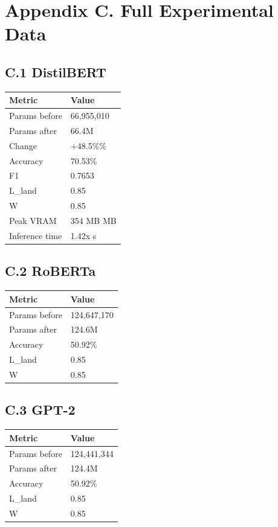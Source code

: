 \section{Appendix C. Full Experimental Data}

\subsection{C.1 DistilBERT}

\begin{table}[H]
\centering
\small
\begin{tabular}{ll}
\toprule
\textbf{Metric} & \textbf{Value} \\
\midrule
Params before & 66,955,010 \\
Params after & 66.4M \\
Change & +48.5\%\% \\
Accuracy & 70.53\% \\
F1 & 0.7653 \\
L\_land & 0.85 \\
W & 0.85 \\
Peak VRAM & 354 MB MB \\
Inference time & 1.42x s \\
\bottomrule
\end{tabular}
\end{table}

\subsection{C.2 RoBERTa}

\begin{table}[H]
\centering
\small
\begin{tabular}{ll}
\toprule
\textbf{Metric} & \textbf{Value} \\
\midrule
Params before & 124,647,170 \\
Params after & 124.6M \\
Accuracy & 50.92\% \\
L\_land & 0.85 \\
W & 0.85 \\
\bottomrule
\end{tabular}
\end{table}

\subsection{C.3 GPT-2}

\begin{table}[H]
\centering
\small
\begin{tabular}{ll}
\toprule
\textbf{Metric} & \textbf{Value} \\
\midrule
Params before & 124,441,344 \\
Params after & 124.4M \\
Accuracy & 50.92\% \\
L\_land & 0.85 \\
W & 0.85 \\
\bottomrule
\end{tabular}
\end{table}

